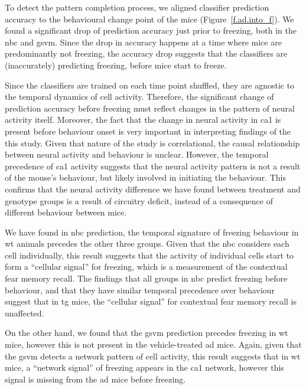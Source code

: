 To detect the pattern completion process, we aligned classifier prediction accuracy to the behavioural change point of the mice (Figure~\ref{f.ad.into_f}). We found a significant drop of prediction accuracy just prior to freezing, both in the \gls{nbc} and \gls{gsvm}. Since the drop in accuracy happens at a time where mice are predominantly not freezing, the accuracy drop suggests that the classifiers are (inaccurately) predicting freezing, before mice start to freeze. 

Since the classifiers are trained on each time point shuffled, they are agnostic to the temporal dynamics of cell activity. Therefore, the significant change of prediction accuracy before freezing must reflect changes in the pattern of neural activity itself. Moreover, the fact that the change in neural activity in \gls{ca1} is present before behaviour onset is very important in interpreting findings of the this study. Given that nature of the study is correlational, the causal relationship between neural activity and behaviour is unclear. However, the temporal precedence of \gls{ca1} activity suggests that the neural activity pattern is not a result of the mouse's behaviour,  but likely involved in initiating the behaviour. This confirms that the neural activity difference we have found between treatment and genotype groups is a result of circuitry deficit, instead of a consequence of different behaviour between mice. 

We have found in \gls{nbc} prediction, the temporal signature of freezing behaviour in \gls{wt} animals precedes the other three groups. Given that the \gls{nbc} considers each cell individually, this result suggests that the activity of individual cells start to form a ``cellular signal'' for freezing, which is a measurement of the contextual fear memory recall. The findings that all groups in \gls{nbc} predict freezing before behaviour, and that they have similar temporal precedence over behaviour suggest that in \gls{tg} mice, the ``cellular signal'' for contextual fear memory recall is unaffected. 

On the other hand, we found that the \gls{gsvm} prediction precedes freezing in \gls{wt} mice, however this is not present in the vehicle-treated \gls{ad} mice. Again, given that the \gls{gsvm} detects a network pattern of cell activity, this result suggests that in \gls{wt} mice, a ``network signal'' of freezing appears in the \gls{ca1} network, however this signal is missing from the \gls{ad} mice before freezing. 

